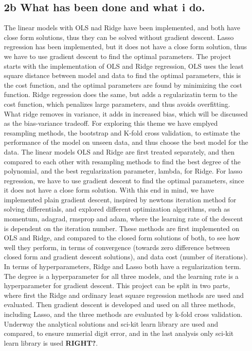 \documentclass[aps,rmp,reprint,amsmath,amssymb,longbibliography]{revtex4-1}
\begin{document}
\subsection{2b What has been done and what i do.}
The linear models with OLS nad Ridge have been implemented, and both have close form solutions, thus they can be solved without gradient descent.
Lasso regression has been implemented, but it does not have a close form solution, thus we have to use gradient descent to find the optimal parameters.
The project starts with the implementation of OLS and Ridge regression, OLS uses the least square distance between model and data to find the optimal parameters, this is the cost function, and the optimal parameters are found by minimizing the cost function.
Ridge regression does the same, but adds a regularizatin term to the cost function, which penalizes large parameters, and thus avoids overfitting.
What ridge removes in variance, it adds in increased bias, which will be discussed as the bias-variance tradeoff. For exploring this theme we have
emplyed resampling methods, the bootstrap and K-fold cross validation, to estimate the performance of the model on unseen data, and thus choose the best model for the data.
The linear models OLS and Ridge are first treated separately, and then compared to each other with resampling methods to find the best degree of the polynomial, and the best regularization parameter, lambda, for Ridge.
For lasso regression, we have to use gradient descent to find the optimal parameters, since it does not have a close form solution.
With this end in mind, we have implemented plain gradient descent, inspired by newtons iteration method for solving differentials, and explored different optimization algorithms,
such as momentum, adagrad, rmsprop and adam, where the learning rate of the descent is dependent on the iteration number. These methods are first
implemented on OLS and Ridge, and compared to the closed form solutions of both, to see how well they perform, in terms of convergence (towards zero difference between closed form and gradient descent solutions), and data cost (number of iterations).
In terms of hyperparameters, Ridge and Lasso both have a regularization term.
The degree is a hyperparameter for all three models, and the learning rate is a hyperparameter for gradient descent.
This project can be split in two parts, where first the Ridge and ordinary least square regression methods
are used and evaluated. Then gradient descent is developed and used on all three methods, including Lasso,
and the three methods are evaluated by k-fold cross validation. Underway the analytical solutions
and sci-kit learn library are used and compared, to ensure numerial digit error, and in the last analysis
only sci-kit learn library is used \textbf{RIGHT?}.
\end{document}
